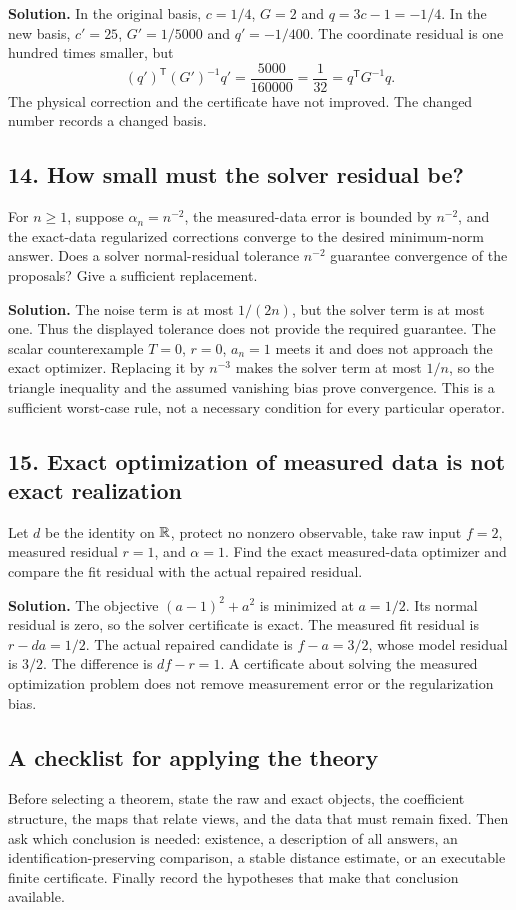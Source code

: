 \documentclass[11pt,oneside,openany]{book}
\numberwithin{equation}{section}
\begin{document}
\textbf{Solution.} In the original basis, $c=1/4$, $G=2$ and $q=3c-1=-1/4$. In the new basis, $c'=25$, $G'=1/5000$ and $q'=-1/400$. The coordinate residual is one hundred times smaller, but
\[
 (q')^{\mathsf T}(G')^{-1}q'=\frac{5000}{160000}=\frac1{32}
 =q^{\mathsf T}G^{-1}q.
\]
The physical correction and the certificate have not improved. The changed number records a changed basis.

\subsection*{14. How small must the solver residual be?}
For $n\ge1$, suppose $\alpha_n=n^{-2}$, the measured-data error is bounded by $n^{-2}$, and the exact-data regularized corrections converge to the desired minimum-norm answer. Does a solver normal-residual tolerance $n^{-2}$ guarantee convergence of the proposals? Give a sufficient replacement.

\textbf{Solution.} The noise term is at most $1/(2n)$, but the solver term is at most one. Thus the displayed tolerance does not provide the required guarantee. The scalar counterexample $T=0$, $r=0$, $a_n=1$ meets it and does not approach the exact optimizer. Replacing it by $n^{-3}$ makes the solver term at most $1/n$, so the triangle inequality and the assumed vanishing bias prove convergence. This is a sufficient worst-case rule, not a necessary condition for every particular operator.

\subsection*{15. Exact optimization of measured data is not exact realization}
Let $d$ be the identity on $\mathbb R$, protect no nonzero observable, take raw input $f=2$, measured residual $r=1$, and $\alpha=1$. Find the exact measured-data optimizer and compare the fit residual with the actual repaired residual.

\textbf{Solution.} The objective $(a-1)^2+a^2$ is minimized at $a=1/2$. Its normal residual is zero, so the solver certificate is exact. The measured fit residual is $r-da=1/2$. The actual repaired candidate is $f-a=3/2$, whose model residual is $3/2$. The difference is $df-r=1$. A certificate about solving the measured optimization problem does not remove measurement error or the regularization bias.

\subsection*{A checklist for applying the theory}
Before selecting a theorem, state the raw and exact objects, the coefficient structure, the maps that relate views, and the data that must remain fixed. Then ask which conclusion is needed: existence, a description of all answers, an identification-preserving comparison, a stable distance estimate, or an executable finite certificate. Finally record the hypotheses that make that conclusion available.
\end{document}
